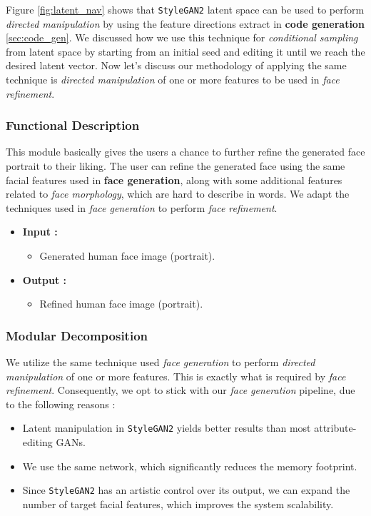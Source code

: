 Figure \ref{fig:latent_nav} shows that \texttt{StyleGAN2} latent space can be used to perform \emph{directed manipulation} by using the feature directions extract in \textbf{code generation} \ref{sec:code_gen}. We discussed how we use this technique for \emph{conditional sampling} from latent space by starting from an initial seed and editing it until we reach the desired latent vector. Now let's discuss our methodology of applying the same technique is \emph{directed manipulation} of one or more features to be used in \emph{face refinement}.

\subsubsection{Functional Description}

This module basically gives the users a chance to further refine the generated face portrait to their liking. The user can refine the generated face using the same facial features used in \textbf{face generation}, along with some additional features related to \emph{face morphology}, which are hard to describe in words. We adapt the techniques used in \emph{face generation} to perform \emph{face refinement}.

\begin{itemize}
    \item \textbf{Input :}
    \begin{itemize}
        \item Generated human face image (portrait).
    \end{itemize}
    \item \textbf{Output :}
    \begin{itemize}
        \item Refined human face image (portrait).
    \end{itemize}
\end{itemize}

\subsubsection{Modular Decomposition}

We utilize the same technique used \emph{face generation} to perform \emph{directed manipulation} of one or more features. This is exactly what is required by \emph{face refinement}. Consequently, we opt to stick with our \emph{face generation} pipeline, due to the following reasons :
\begin{itemize}
    \item Latent manipulation in \texttt{StyleGAN2} yields better results than most attribute-editing GANs.
    \item We use the same network, which significantly reduces the memory footprint.
    \item Since \texttt{StyleGAN2} has an artistic control over its output, we can expand the number of target facial features, which improves the system scalability. 
\end{itemize}

